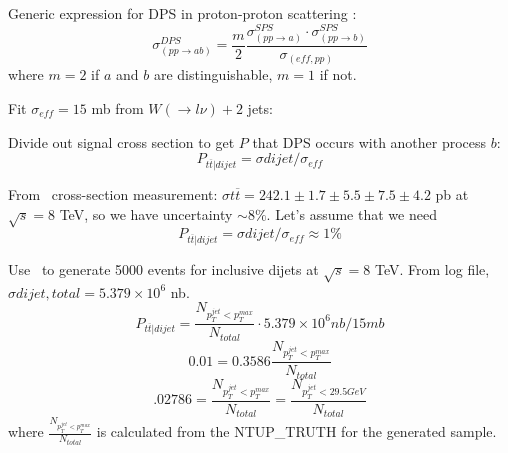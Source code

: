 Generic expression for DPS in proton-proton scattering \cite{DPS}:
\begin{equation}
\sigma^{DPS}_{(pp \rightarrow ab)} = \frac{m}{2} \frac {\sigma^{SPS}_{(pp \rightarrow a)} \cdot \sigma^{SPS}_{(pp \rightarrow b)}}{\sigma_{(eff, pp)}}
\end{equation}
where $m=2$ if $a$ and $b$ are distinguishable, $m=1$ if not.

Fit $\sigma_{eff}= 15$ mb  from $W(\rightarrow l \nu ) + 2$ jets\cite{Jpsi}:

Divide out signal cross section to get $P$ that DPS occurs with another process $b$\cite{Jpsi}:
\begin{equation}
P_{t\overline{t} |dijet } = \sigma{dijet} / \sigma_{eff}
\end{equation}

From \ttbar\ cross-section measurement\cite{xsec}: $\sigma {t\overline{t}} = 242.1 \pm 1.7 \pm 5.5 \pm 7.5 \pm 4.2$ pb at $\sqrt{s}=8$ TeV, so we have uncertainty $\sim 8 \%$. Let's assume that we need
\begin{equation}
P_{t\overline{t} |dijet }= \sigma{dijet} / \sigma_{eff} \approx 1 \%
\end{equation}

Use \py\ to generate 5000 events for inclusive dijets at  $\sqrt{s}=8$ TeV. From log file, $ \sigma{dijet, total} = 5.379 \times 10^6$ nb.
\begin{equation}
P_{t\overline{t} |dijet }= \frac{N_{p_{T}^{jet} <p_{T}^{max} }}{N_{total}} \cdot 5.379 \times 10^6 nb / 15 mb 
\end{equation}
\begin{equation}
0.01=  0.3586 \frac{N_{p_{T}^{jet} <p_{T}^{max} }}{N_{total}} 
\end{equation}
\begin{equation}
.02786=\frac{N_{p_{T}^{jet} <p_{T}^{max} }}{N_{total}}=\frac{N_{p_{T}^{jet} <29.5 GeV}}{N_{total}}
\end{equation}
where $\frac{N_{p_{T}^{jet} <p_{T}^{max} }}{N_{total}}$ is calculated from the NTUP\_TRUTH for the generated sample.
\clearpage
